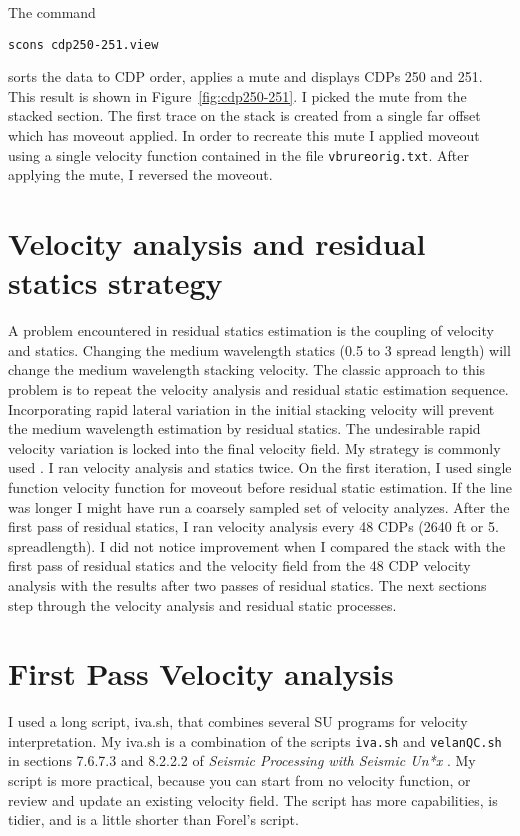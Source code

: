 The command
\begin{verbatim}
scons cdp250-251.view 
\end{verbatim}
sorts the data to CDP order, applies a mute and displays CDPs 250 and 
251.  This result is shown in Figure~\ref{fig:cdp250-251}.  I picked 
the mute from the stacked section.  The first trace on the stack is 
created from a single far offset which has moveout applied.  
In order to recreate this mute I applied moveout using a single velocity 
function contained in the file \texttt{vbrureorig.txt}. After applying the mute, 
I reversed the moveout.

\section{Velocity analysis and residual statics strategy}
A problem encountered in residual statics estimation is the coupling of 
velocity and statics.  Changing the medium wavelength statics (0.5 to 3 
spread length) will change the medium wavelength stacking velocity.  
The classic approach to this problem is to repeat the velocity analysis 
and residual static estimation sequence.  Incorporating rapid lateral 
variation in the initial stacking velocity will prevent the medium wavelength 
estimation by residual statics.  The undesirable rapid velocity variation 
is locked into the final velocity field.  My strategy is 
commonly used \cite[]{SCS00-00-00010531}.  I ran velocity analysis and statics twice.  On the first 
iteration, I used single function velocity function for moveout before 
residual static estimation.  If the line was longer I might have run
a coarsely sampled set of velocity analyzes. After the first 
pass of residual statics,  I ran velocity analysis every 48 CDPs (2640 ft 
or 5. spreadlength).  I did not notice improvement when I compared the 
stack with the first pass of residual statics and the velocity field from 
the 48 CDP velocity analysis with the results after two passes of residual 
statics.  The next sections step through the velocity analysis and residual 
static processes.

\section{First Pass Velocity analysis}
I used a long script, iva.sh, that combines several SU programs for velocity 
interpretation.  My iva.sh is a combination of the scripts \texttt{iva.sh} and 
\texttt{velanQC.sh} in sections 7.6.7.3 and 8.2.2.2 of 
\emph{Seismic Processing with Seismic Un*x} \cite[]{forel}.  My script is 
more practical, because you can start from no velocity function, or review 
and update an existing velocity field.  The script has more capabilities, 
is tidier, and is a little shorter than Forel's script.

